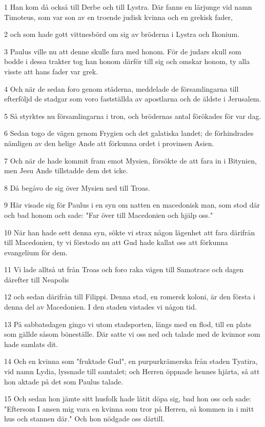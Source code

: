 \par 1 Han kom då också till Derbe och till Lystra. Där fanns en lärjunge vid namn Timoteus, som var son av en troende judisk kvinna och en grekisk fader,
\par 2 och som hade gott vittnesbörd om sig av bröderna i Lystra och Ikonium.
\par 3 Paulus ville nu att denne skulle fara med honom. För de judars skull som bodde i dessa trakter tog han honom därför till sig och omskar honom, ty alla visste att hans fader var grek.
\par 4 Och när de sedan foro genom städerna, meddelade de församlingarna till efterföljd de stadgar som voro fastställda av apostlarna och de äldste i Jerusalem.
\par 5 Så styrktes nu församlingarna i tron, och brödernas antal förökades för var dag.
\par 6 Sedan togo de vägen genom Frygien och det galatiska landet; de förhindrades nämligen av den helige Ande att förkunna ordet i provinsen Asien.
\par 7 Och när de hade kommit fram emot Mysien, försökte de att fara in i Bitynien, men Jesu Ande tillstadde dem det icke.
\par 8 Då begåvo de sig över Mysien ned till Troas.
\par 9 Här visade sig för Paulus i en syn om natten en macedonisk man, som stod där och bad honom och sade: "Far över till Macedonien och hjälp oss."
\par 10 När han hade sett denna syn, sökte vi strax någon lägenhet att fara därifrån till Macedonien, ty vi förstodo nu att Gud hade kallat oss att förkunna evangelium för dem.
\par 11 Vi lade alltså ut från Troas och foro raka vägen till Samotrace och dagen därefter till Neapolis
\par 12 och sedan därifrån till Filippi. Denna stad, en romersk koloni, är den första i denna del av Macedonien. I den staden vistades vi någon tid.
\par 13 På sabbatsdagen gingo vi utom stadsporten, längs med en flod, till en plats som gällde såsom böneställe. Där satte vi oss ned och talade med de kvinnor som hade samlats dit.
\par 14 Och en kvinna som "fruktade Gud", en purpurkrämerska från staden Tyatira, vid namn Lydia, lyssnade till samtalet; och Herren öppnade hennes hjärta, så att hon aktade på det som Paulus talade.
\par 15 Och sedan hon jämte sitt husfolk hade låtit döpa sig, bad hon oss och sade: "Eftersom I ansen mig vara en kvinna som tror på Herren, så kommen in i mitt hus och stannen där." Och hon nödgade oss därtill.
